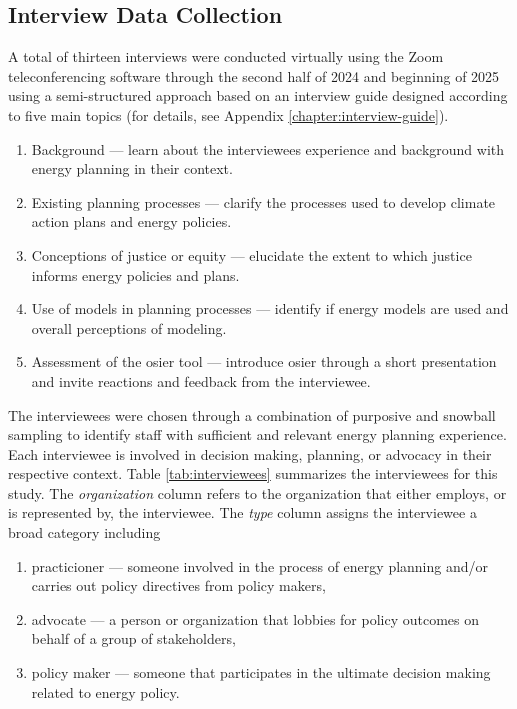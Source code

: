 \subsection{Interview Data Collection}

A total of thirteen interviews were conducted virtually using the Zoom
teleconferencing software through the second half of 2024 and beginning of 2025
using a semi-structured approach based on an interview guide designed according
to five main topics (for details, see Appendix \ref{chapter:interview-guide}).
\begin{enumerate}
    \item Background --- learn about the interviewees experience and background
    with energy planning in their context.
    \item Existing planning processes --- clarify the processes used to develop
    climate action plans and energy policies.
    \item Conceptions of justice or equity --- elucidate the extent to which
    justice informs energy policies and plans.
    \item Use of models in planning processes --- identify if energy models are
    used and overall perceptions of modeling.
    \item Assessment of the \ac{osier} tool --- introduce \ac{osier} through a
    short presentation and invite reactions and feedback from the interviewee.
\end{enumerate}
The interviewees were chosen through a combination of purposive and snowball
sampling to identify staff with sufficient and relevant energy planning
experience. Each interviewee is involved in decision making, planning, or
advocacy in their respective context. Table \ref{tab:interviewees} summarizes
the interviewees for this study. The \textit{organization} column refers to the
organization that either employs, or is represented by, the interviewee. The
\textit{type} column assigns the interviewee a broad category including
\begin{enumerate}
    \item practicioner --- someone involved in the process of energy planning
    and/or carries out policy directives from policy makers,
    \item advocate --- a person or organization that lobbies for policy outcomes
    on behalf of a group of stakeholders,
    \item policy maker --- someone that participates in the ultimate decision
    making related to energy policy.
\end{enumerate}
    
